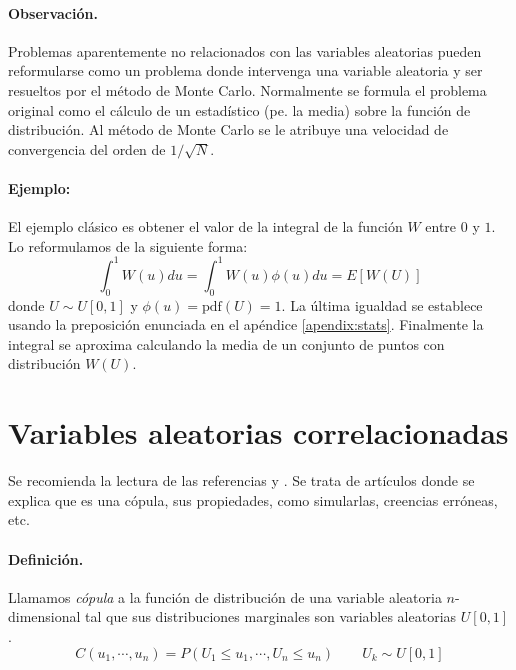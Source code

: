 \paragraph{Observaci\'on.} Problemas aparentemente no relacionados con las 
variables aleatorias pueden reformularse como un problema donde intervenga
una variable aleatoria y ser resueltos por el m\'etodo de Monte Carlo. 
Normalmente se formula el problema original como el c\'alculo de un 
estad\'istico (pe. la media) sobre la funci\'on de distribuci\'on. Al
m\'etodo de Monte Carlo se le atribuye una velocidad de convergencia  
del orden de $1/\sqrt{N}$.

\paragraph{Ejemplo:} El ejemplo cl\'asico es obtener el valor de la integral 
de la funci\'on $W$ entre $0$ y $1$. Lo reformulamos de la siguiente forma:
\begin{displaymath}
\int_{0}^{1} W(u) du = \int_{0}^{1} W(u) \phi(u) du = E[W(U)]
\end{displaymath}
donde $U \sim U[0,1]$ y $\phi(u) = \textrm{pdf}(U) = 1$. La \'ultima igualdad se
establece usando la preposici\'on enunciada en el ap\'endice \ref{apendix:stats}.
Finalmente la integral se aproxima calculando la media de un conjunto de puntos
con distribuci\'on $W(U)$.


\section{Variables aleatorias correlacionadas}

Se recomienda la lectura de las referencias \cite{copu:wang} y 
\cite{copu:pitfalls}. Se trata de art\'iculos donde se explica que es una 
c\'opula, sus propiedades, como simularlas, creencias err\'oneas, etc.

\paragraph{Definici\'on.} Llamamos \emph{c\'opula} a la funci\'on
de distribuci\'on de una variable aleatoria $n$-dimensional tal que sus distribuciones
marginales  son variables aleatorias $U[0,1]$.
\begin{displaymath}
C(u_1, \cdots,u_n)=P(U_1 \leq u_1, \cdots, U_n \leq u_n) \qquad U_k \sim U[0,1]
\end{displaymath}

